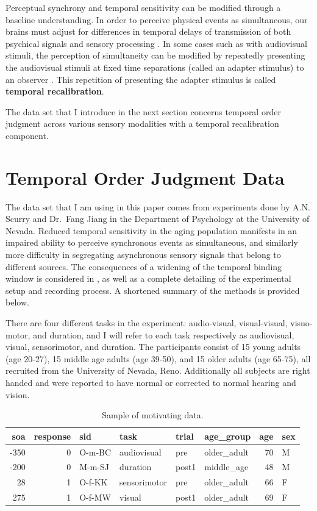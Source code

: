 \documentclass[11pt, oneside, openany]{scrbook}
\begin{document}
Perceptual synchrony and temporal sensitivity can be modified through a baseline understanding. In order to perceive physical events as simultaneous, our brains must adjust for differences in temporal delays of transmission of both psychical signals and sensory processing \citep{fujisaki2004recalibration}. In some cases such as with audiovisual stimuli, the perception of simultaneity can be modified by repeatedly presenting the audiovisual stimuli at fixed time separations (called an adapter stimulus) to an observer \citep{vroomen2004recalibration}. This repetition of presenting the adapter stimulus is called \textbf{temporal recalibration}.

The data set that I introduce in the next section concerns temporal order judgment across various sensory modalities with a temporal recalibration component.

\hypertarget{toj-task}{%
\section{Temporal Order Judgment Data}\label{toj-task}}

The data set that I am using in this paper comes from experiments done by A.N. Scurry and Dr.~Fang Jiang in the Department of Psychology at the University of Nevada. Reduced temporal sensitivity in the aging population manifests in an impaired ability to perceive synchronous events as simultaneous, and similarly more difficulty in segregating asynchronous sensory signals that belong to different sources. The consequences of a widening of the temporal binding window is considered in \citet{scurry2019aging}, as well as a complete detailing of the experimental setup and recording process. A shortened summary of the methods is provided below.

There are four different tasks in the experiment: audio-visual, visual-visual, visuo-motor, and duration, and I will refer to each task respectively as audiovisual, visual, sensorimotor, and duration. The participants consist of 15 young adults (age 20-27), 15 middle age adults (age 39-50), and 15 older adults (age 65-75), all recruited from the University of Nevada, Reno. Additionally all subjects are right handed and were reported to have normal or corrected to normal hearing and vision.

\begin{table}[!h]

\caption{\label{tab:ch020-multitask-data}Sample of motivating data.}
\centering
\begin{tabular}[t]{rrllllrl}
\toprule
soa & response & sid & task & trial & age\_group & age & sex\\
\midrule
-350 & 0 & O-m-BC & audiovisual & pre & older\_adult & 70 & M\\
-200 & 0 & M-m-SJ & duration & post1 & middle\_age & 48 & M\\
28 & 1 & O-f-KK & sensorimotor & pre & older\_adult & 66 & F\\
275 & 1 & O-f-MW & visual & post1 & older\_adult & 69 & F\\
\bottomrule
\end{tabular}
\end{table}
\end{document}
